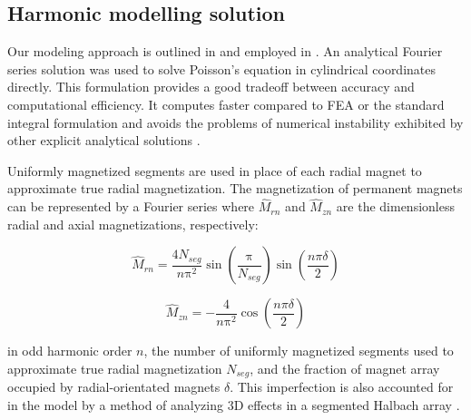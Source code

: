     
    \subsection{Harmonic modelling solution}               \label{Chapter:PMLSM design HM/electromagnetic model/hm solution}

                
        Our modeling approach is outlined in \cite{Ruddy2011a} and employed in \cite{ruddy2014,Ruddy2015}. An analytical Fourier series solution was used to solve Poisson's equation in cylindrical coordinates directly. This formulation provides a good tradeoff between accuracy and computational efficiency. It computes faster compared to FEA \cite{Jin2014} or the standard integral formulation \cite{Wang1999,Bianchi2000} and avoids the problems of numerical instability exhibited by other explicit analytical solutions \cite{Wijono2010,Yan2013}.
        
        
        Uniformly magnetized segments are used in place of each radial magnet to approximate true radial magnetization. The magnetization of permanent magnets can be represented by a Fourier series where ${\hat M}_{rn}$ and  ${\hat M}_{zn}$ are the dimensionless radial and axial magnetizations, respectively:


        \begin{equation}
            {\hat M}_{rn}=\frac{4N_{seg}}{n\mathrm\pi^2}\sin\left(\frac{\mathrm\pi}{N_{seg}}\right)\sin\left(\frac{n\pi\delta}2\right)
            \label{eq:Mrn}
        \end{equation}
        
        
        \begin{equation}
            {\hat M}_{zn}=-\frac4{n\mathrm\pi^2}\cos\left(\frac{n\pi\delta}2\right)
            \label{eq:Mzn}
        \end{equation}
        
        
        in odd harmonic order $n$, the number of uniformly magnetized segments used to approximate true radial magnetization $N_{seg}$, and the fraction of magnet array occupied by radial-orientated magnets $\delta$. This imperfection is also accounted for in the model by a method of analyzing 3D effects in a segmented Halbach array \cite{Meessen2011}.


